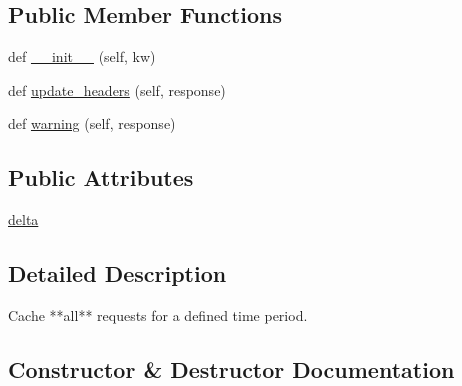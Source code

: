 \subsection*{Public Member Functions}
\begin{DoxyCompactItemize}
\item 
def \hyperlink{classpip_1_1__vendor_1_1cachecontrol_1_1heuristics_1_1ExpiresAfter_a8cb6383fa3a70a032770fb2d7fd8010e}{\+\_\+\+\_\+init\+\_\+\+\_\+} (self, kw)
\item 
def \hyperlink{classpip_1_1__vendor_1_1cachecontrol_1_1heuristics_1_1ExpiresAfter_a06310c537876f17def93881982c546e2}{update\+\_\+headers} (self, response)
\item 
def \hyperlink{classpip_1_1__vendor_1_1cachecontrol_1_1heuristics_1_1ExpiresAfter_a9d3925648f0bed035d0fb065a602d6cb}{warning} (self, response)
\end{DoxyCompactItemize}
\subsection*{Public Attributes}
\begin{DoxyCompactItemize}
\item 
\hyperlink{classpip_1_1__vendor_1_1cachecontrol_1_1heuristics_1_1ExpiresAfter_a103c51f0191cdb19f8d11a39f2e11336}{delta}
\end{DoxyCompactItemize}


\subsection{Detailed Description}
\begin{DoxyVerb}Cache **all** requests for a defined time period.
\end{DoxyVerb}
 

\subsection{Constructor \& Destructor Documentation}
\mbox{\label{classpip_1_1__vendor_1_1cachecontrol_1_1heuristics_1_1ExpiresAfter_a8cb6383fa3a70a032770fb2d7fd8010e}} 
